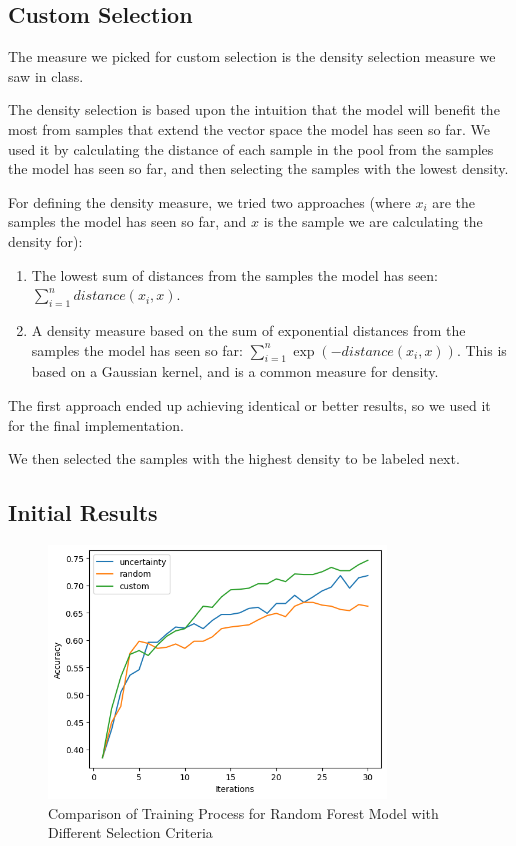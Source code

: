 \documentclass[12pt]{article}
\begin{document}
\subsection{Custom Selection}

The measure we picked for custom selection is the density selection measure we saw in class.

The density selection is based upon the intuition that the model will benefit the most from samples that extend the vector space the model has seen so far. We used it by calculating the distance of each sample in the pool from the samples the model has seen so far, and then selecting the samples with the lowest density.

For defining the density measure, we tried two approaches (where $x_i$ are the samples the model has seen so far, and $x$ is the sample we are calculating the density for):

\begin{enumerate}
    \item The lowest sum of distances from the samples the model has seen: $ \sum_{i=1}^{n} distance(x_i, x) $.
    \item A density measure based on the sum of exponential distances from the samples the model has seen so far: $ \sum_{i=1}^{n} \exp(-distance(x_i, x)) $.
    This is based on a Gaussian kernel, and is a common measure for density.
\end{enumerate}
The first approach ended up achieving identical or better results, so we used it for the final implementation.

We then selected the samples with the highest density to be labeled next.

\subsection{Initial Results}

\begin{figure}[H]
    \centering
    \includegraphics[width=0.8\textwidth]{random_forest_train.png}
    \caption{Comparison of Training Process for Random Forest Model with Different Selection Criteria}
\end{figure}
\end{document}

